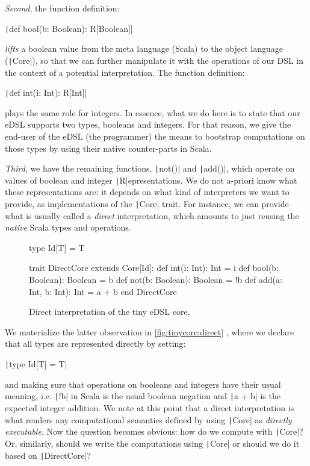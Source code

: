 \documentclass[11pt]{article}
\renewcommand{\vref}[1]{\autoref{#1} \vpageref{#1}}{}
\newcommand{\ScalaI}[1]{\texttt|#1|}
\newcommand{\FirstEtcX}[1]{\marginpar{\faCube{ \smaller #1}}\xspace}
\newcommand{\FirstEtc}{\FirstEtcX{}}
\begin{document}
\textit{Second}\FirstEtc, the function definition:

\par\ScalaI{def bool(b: Boolean): R[Boolean]}

\noindent\textit{lifts} a boolean value from the meta language (Scala) to the 
object language (\ScalaI{Core}), so that we can further manipulate it with 
the operations of our DSL in the context of a potential interpretation. The 
function definition:

\par\ScalaI{def int(i: Int): R[Int]}

\noindent plays the same role for integers. In essence, what we do here is to 
state that our eDSL supports two types, booleans and integers. For that 
reason, we give the end-user of the eDSL (the programmer) the means to 
bootstrap computations on those types by using their native counter-parts in 
Scala.

\textit{Third}\FirstEtc, we have the remaining functions, \ScalaI{not()} and 
\ScalaI{add()}, which operate on values of boolean and integer 
\ScalaI{R}epresentations. We do not a-priori know what these representations 
are: it depends on what kind of interpreters we want to provide, as 
implementations of the \ScalaI{Core} trait. For instance, we can provide what 
is usually called a \textit{direct} interpretation, which amounts to just 
reusing the \textit{native} Scala types and operations.

\begin{figure}[t]
\begin{ScalaBlock}
type Id[T] = T

trait DirectCore extends Core[Id]:
  def int(i: Int): Int = i
  def bool(b: Boolean): Boolean = b
  def not(b: Boolean): Boolean = !b
  def add(a: Int, b: Int): Int = a + b
end DirectCore
\end{ScalaBlock}
\caption{Direct interpretation of the tiny eDSL core.}
\label{fig:tinycore:direct}
\hrulefill
\end{figure}

We materialize the latter observation in \vref{fig:tinycore:direct}, where we 
declare that all types are represented directly by setting:

\par\ScalaI{type Id[T] = T}

\noindent and making sure that operations on booleans and integers have their 
usual meaning, i.e. \ScalaI{!b} in Scala is the usual boolean negation and 
\ScalaI{a + b} is the expected integer addition. We note at this point that a 
direct interpretation is what renders any computational semantics defined by 
using \ScalaI{Core} as \textit{directly executable}. 
Now the question becomes obvious: how do we compute with \ScalaI{Core}? Or, 
similarly, should we write the computations using \ScalaI{Core} or should we 
do it based on \ScalaI{DirectCore}?
\end{document}

